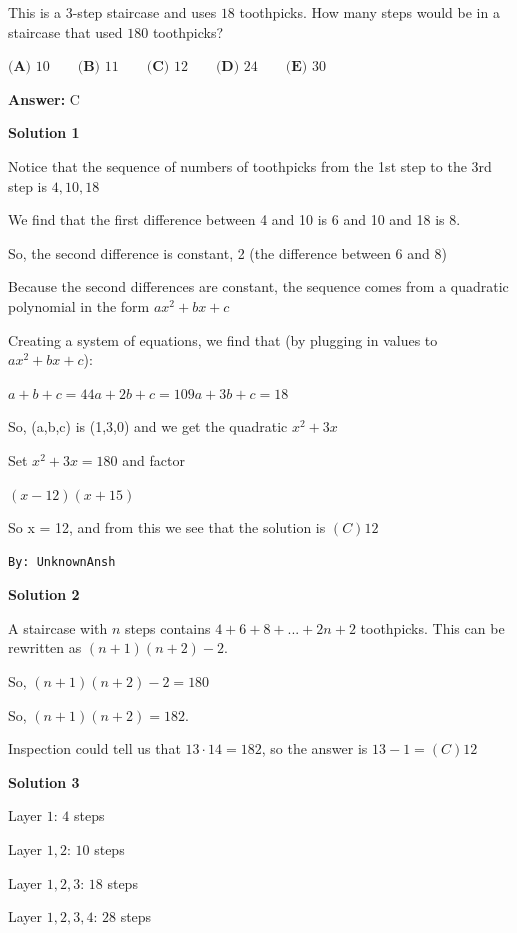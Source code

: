 \begin{enumerate}
 This is a $3$-step staircase and uses $18$ toothpicks. How many steps would be in a staircase that used $180$ toothpicks?


 $\textbf{(A) }10 \qquad \textbf{(B) }11 \qquad \textbf{(C) }12 \qquad \textbf{(D) }24 \qquad \textbf{(E) }30 \qquad$

 \textbf{Answer: }C



\textbf{Solution 1}

Notice that the sequence of numbers of toothpicks from the 1st step to the 3rd step is $4, 10, 18$

 We find that the first difference between 4 and 10 is 6 and 10 and 18 is 8.

 So, the second difference is constant, 2 (the difference between 6 and 8)

 Because the second differences are constant, the sequence comes from a quadratic polynomial in the form $ax^2+bx+c$

 Creating a system of equations, we find that (by plugging in values to $ax^2+bx+c$):

 $a + b + c = 4$$4a + 2b + c = 10$$9a + 3b + c = 18$

 So, (a,b,c) is (1,3,0) and we get the quadratic $x^2 + 3x$

 Set $x^2 + 3x = 180$ and factor

 $(x-12)(x+15)$

 So x = 12, and from this we see that the solution is $\boxed {(C) 12}$
\begin{verbatim}
By: UnknownAnsh
\end{verbatim}





\textbf{Solution 2}

A staircase with $n$ steps contains $4 + 6 + 8 + ... + 2n + 2$ toothpicks. This can be rewritten as $(n+1)(n+2) -2$. 

 So, $(n+1)(n+2) - 2 = 180$

 So, $(n+1)(n+2) = 182.$ 

 Inspection could tell us that $13 \cdot 14 = 182$, so the answer is $13 - 1 = \boxed {(C) 12}$




\textbf{Solution 3}

Layer $1$: $4$ steps

 Layer $1,2$: $10$ steps

 Layer $1,2,3$: $18$ steps

 Layer $1,2,3,4$: $28$ steps


\end{enumerate}
